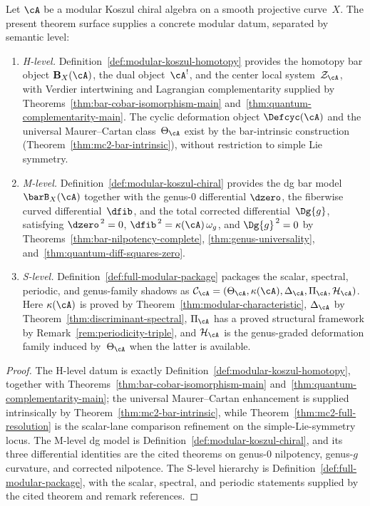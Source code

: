 \begin{theorem}
\label{thm:volume-one-concrete-modular-datum}
Let $\cA$ be a modular Koszul chiral algebra on a smooth projective
curve~$X$. The present theorem surface supplies a concrete modular
datum, separated by semantic level:
\begin{enumerate}[label=\textup{(\roman*)}]
\item \emph{H-level.}
 Definition~\ref{def:modular-koszul-homotopy} provides the
 homotopy bar object $\mathbf{B}_X(\cA)$, the dual object~$\cA^!$,
 and the center local system~$\mathcal{Z}_{\cA}$, with Verdier
 intertwining and Lagrangian complementarity supplied by
 Theorems~\ref{thm:bar-cobar-isomorphism-main}
 and~\ref{thm:quantum-complementarity-main}. The cyclic deformation
 object $\Defcyc(\cA)$ and the universal Maurer--Cartan
 class~$\Theta_{\cA}$ exist by the bar-intrinsic construction
 (Theorem~\ref{thm:mc2-bar-intrinsic}), without restriction to
 simple Lie symmetry.
\item \emph{M-level.}
 Definition~\ref{def:modular-koszul-chiral} provides the dg bar
 model~$\barB_X(\cA)$ together with the genus-$0$ differential
 $\dzero$, the fiberwise curved differential~$\dfib$, and the total
 corrected differential~$\Dg{g}$, satisfying
 $\dzero^{\,2} = 0$,
 $\dfib^{\,2} = \kappa(\cA)\,\omega_g$,
 and $\Dg{g}^{\,2} = 0$
 by Theorems~\ref{thm:bar-nilpotency-complete},
 \ref{thm:genus-universality},
 and~\ref{thm:quantum-diff-squares-zero}.
\item \emph{S-level.}
 Definition~\ref{def:full-modular-package} packages the scalar,
 spectral, periodic, and genus-family shadows as
 $\mathcal{C}_{\cA}
 = (\Theta_{\cA}, \kappa(\cA), \Delta_{\cA}, \Pi_{\cA},
 \mathcal{H}_{\cA})$.
 Here $\kappa(\cA)$ is proved by
 Theorem~\ref{thm:modular-characteristic},
 $\Delta_{\cA}$ by
 Theorem~\ref{thm:discriminant-spectral},
 $\Pi_{\cA}$ has a proved structural framework by
 Remark~\ref{rem:periodicity-triple},
 and $\mathcal{H}_{\cA}$ is the genus-graded deformation family
 induced by~$\Theta_{\cA}$ when the latter is available.
\end{enumerate}
\end{theorem}

\begin{proof}
The H-level datum is exactly
Definition~\ref{def:modular-koszul-homotopy}, together with
Theorems~\ref{thm:bar-cobar-isomorphism-main}
and~\ref{thm:quantum-complementarity-main}; the universal
Maurer--Cartan enhancement is supplied intrinsically by
Theorem~\ref{thm:mc2-bar-intrinsic}, while
Theorem~\ref{thm:mc2-full-resolution} is the scalar-lane comparison
refinement on the simple-Lie-symmetry locus. The M-level dg model is
Definition~\ref{def:modular-koszul-chiral}, and its three
differential identities are the cited theorems on genus-$0$
nilpotency, genus-$g$ curvature, and corrected nilpotence. The
S-level hierarchy is
Definition~\ref{def:full-modular-package}, with the scalar,
spectral, and periodic statements supplied by the cited theorem and
remark references.
\end{proof}

